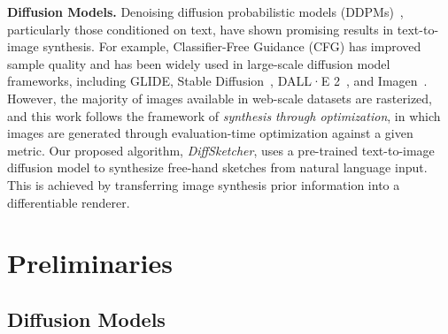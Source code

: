\documentclass{article}
\begin{document}
\noindent\textbf{Diffusion Models.} Denoising diffusion probabilistic models (DDPMs)~\cite{diffusion_models_dickstein_2015,EestGrad_song_2019,ddpm_ho_2020,scorebased_song_2021}, particularly those conditioned on text, have shown promising results in text-to-image synthesis. For example, Classifier-Free Guidance (CFG)\cite{classifierfree_2022_ho} has improved sample quality and has been widely used in large-scale diffusion model frameworks, including GLIDE\cite{GLIDE_2022_nichol}, Stable Diffusion~\cite{ldm_2022_Rombach}, DALL·E 2~\cite{DALLE2_2022_ramesh}, and Imagen~\cite{imagen_2022_saharia}. However, the majority of images available in web-scale datasets are rasterized, and this work follows the framework of \textit{synthesis through optimization}, in which images are generated through evaluation-time optimization against a given metric. Our proposed algorithm, \textit{DiffSketcher}, uses a pre-trained text-to-image diffusion model to synthesize free-hand sketches from natural language input. This is achieved by transferring image synthesis prior information into a differentiable renderer.

\section{Preliminaries}

\subsection{Diffusion Models}
\end{document}
